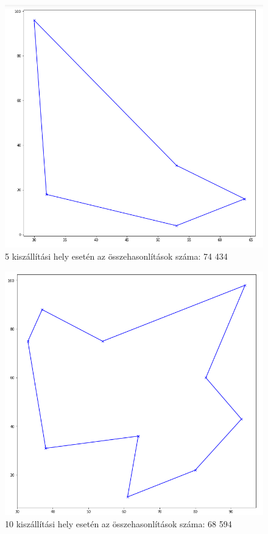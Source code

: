 \begin{figure}[h!]
\centering
\includegraphics[scale=0.4]{images/5.png}
\caption{5 kiszállítási hely esetén az összehasonlítások száma: 74 434}
\label{fig:tsp5location}
\end{figure}

\begin{figure}[h!]
\centering
\includegraphics[scale=0.4]{images/10.png}
\caption{10 kiszállítási hely esetén az összehasonlítások száma: 68 594}
\label{fig:tsp10location}
\end{figure}

